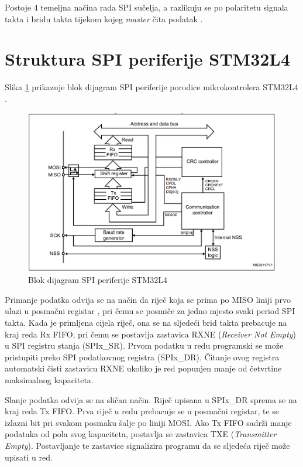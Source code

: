 		Postoje 4 temeljna načina rada  SPI sučelja, a razlikuju se po polaritetu signala takta  i bridu takta tijekom kojeg \textit{master} čita podatak .
		
	\section{Struktura SPI periferije STM32L4}
		Slika \ref{fig:stm32l4_spi} prikazuje blok dijagram SPI periferije porodice mikrokontrolera STM32L4 \citep{stm32l4}.
	
		\begin{figure}[htb]
			\centering
			\includegraphics{slike/STM32L4_SPI_blok_dijagram.png}
			\caption{Blok dijagram SPI periferije STM32L4}
			\label{fig:stm32l4_spi}
		\end{figure}
	
		Primanje podatka odvija se na način da riječ koja se prima po MISO liniji prvo ulazi u posmačni registar , pri čemu se posmiče za jedno mjesto svaki period SPI takta. Kada je primljena cijela riječ, ona se na sljedeći brid takta prebacuje na kraj reda Rx FIFO, pri čemu se postavlja zastavica RXNE (\textit{Receiver Not Empty}) u SPI registru stanja (SPIx\_SR). Prvom podatku u redu programski se može pristupiti preko SPI podatkovnog registra (SPIx\_DR). Čitanje ovog registra automatski čisti zastavicu RXNE ukoliko je red popunjen manje od četvrtine maksimalnog kapaciteta.
		
		Slanje podatka odvija se na sličan način. Riječ upisana u SPIx\_DR sprema se na kraj reda Tx FIFO. Prva riječ u redu prebacuje se u posmačni registar, te se izlazni bit pri svakom posmaku šalje po liniji MOSI. Ako Tx FIFO sadrži manje podataka od pola svog kapaciteta, postavlja se zastavica TXE (\textit{Transmitter Empty}). Postavljanje te zastavice signalizira programu da se sljedeća riječ može upisati u red.
		
